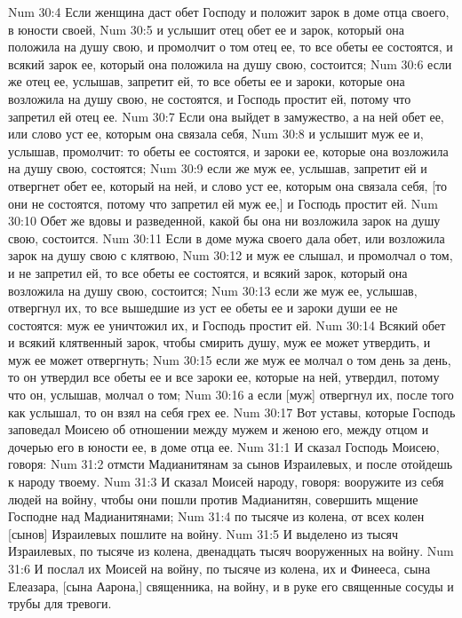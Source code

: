 \vs Num 30:4 Если женщина даст обет Господу и положит  зарок в доме отца своего, в юности своей,
\vs Num 30:5 и услышит отец обет ее и зарок, который она положила на душу свою, и промолчит о том отец ее, то все обеты ее состоятся, и всякий зарок ее, который она положила на душу свою, состоится;
\vs Num 30:6 если же отец ее, услышав, запретит ей, то все обеты ее и зароки, которые она возложила на душу свою, не состоятся, и Господь простит ей, потому что запретил ей отец ее.
\vs Num 30:7 Если она выйдет в замужество, а на ней обет ее, или слово уст ее, которым она связала себя,
\vs Num 30:8 и услышит муж ее и, услышав, промолчит: то обеты ее состоятся, и зароки ее, которые она возложила на душу свою, состоятся;
\vs Num 30:9 если же муж ее, услышав, запретит ей и отвергнет обет ее, который на ней, и слово уст ее, которым она связала себя, [то они не состоятся, потому что запретил ей муж ее,] и Господь простит ей.
\vs Num 30:10 Обет же вдовы и разведенной, какой бы она ни возложила зарок на душу свою, состоится.
\vs Num 30:11 Если  в доме мужа своего дала обет, или возложила зарок на душу свою с клятвою,
\vs Num 30:12 и муж ее слышал, и промолчал о том, и не запретил ей, то все обеты ее состоятся, и всякий зарок, который она возложила на душу свою, состоится;
\vs Num 30:13 если же муж ее, услышав, отвергнул их, то все вышедшие из уст ее обеты ее и зароки души ее не состоятся: муж ее уничтожил их, и Господь простит ей.
\vs Num 30:14 Всякий обет и всякий клятвенный зарок, чтобы смирить душу, муж ее может утвердить, и муж ее может отвергнуть;
\vs Num 30:15 если же муж ее молчал о том день за день, то он  утвердил все обеты ее и все зароки ее, которые на ней, утвердил, потому что он, услышав, молчал о том;
\vs Num 30:16 а если [муж] отвергнул их, после того как услышал, то он взял на себя грех ее.
\rsbpar\vs Num 30:17 Вот уставы, которые Господь заповедал Моисею об отношении между мужем и женою его, между отцом и дочерью его в юности ее, в доме отца ее.
\vs Num 31:1 И сказал Господь Моисею, говоря:
\vs Num 31:2 отмсти Мадианитянам за сынов Израилевых, и после отойдешь к народу твоему.
\vs Num 31:3 И сказал Моисей народу, говоря: вооружите из себя людей на войну, чтобы они пошли против Мадианитян, совершить мщение Господне над Мадианитянами;
\vs Num 31:4 по тысяче из колена, от всех колен [сынов] Израилевых пошлите на войну.
\vs Num 31:5 И выделено из тысяч Израилевых, по тысяче из колена, двенадцать тысяч вооруженных на войну.
\vs Num 31:6 И послал их Моисей на войну, по тысяче из колена, их и Финееса, сына Елеазара, [сына Аарона,] священника, на войну, и в руке его священные сосуды и трубы для тревоги.
